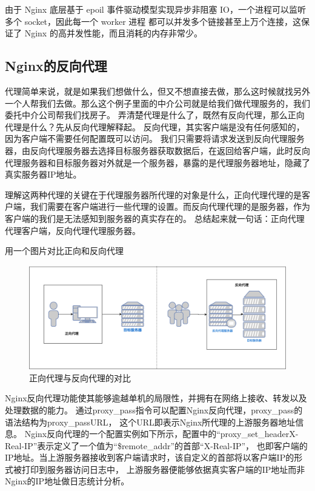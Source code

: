 由于 Nginx 底层基于 epoil 事件驱动模型实现异步非阻塞 IO，一个进程可以监听多个 socket，因此每一个 worker 进程
都可以并发多个链接甚至上万个连接\cite{张炜森2018nginx}，这保证了 Nginx 的高并发性能，而且消耗的内存非常少。

\subsection{Nginx的反向代理}

代理简单来说，就是如果我们想做什么，但又不想直接去做，那么这时候就找另外一个人帮我们去做。那么这个例子里面的中介公司就是给我们做代理服务的，我们委托中介公司帮我们找房子。
弄清楚代理是什么了，既然有反向代理，那么正向代理是什么？先从反向代理解释起。
反向代理，其实客户端是没有任何感知的，因为客户端不需要任何配置既可以访问。
我们只需要将请求发送到反向代理服务器，由反向代理服务器去选择目标服务器获取数据后，在返回给客户端，此时反向代理服务器和目标服务器对外就是一个服务器，暴露的是代理服务器地址，隐藏了真实服务器IP地址。

理解这两种代理的关键在于代理服务器所代理的对象是什么，正向代理代理的是客户端，我们需要在客户端进行一些代理的设置。而反向代理代理的是服务器，作为客户端的我们是无法感知到服务器的真实存在的。
总结起来就一句话：正向代理代理客户端，反向代理代理服务器\cite{崔娟2023基于Nginx反向代理解决公网上服务跨域问题的研究}。

用一个图片对比正向和反向代理

\begin{figure}[htb]
  \centering
  \includegraphics[width=\textwidth]{figures/Forward-Proxy-Reverse-Proxy.png}
  \caption{正向代理与反向代理的对比}
\end{figure}

Nginx反向代理功能使其能够逾越单机的局限性，并拥有在网络上接收、转发以及处理数据的能力\cite{马原龙2016nginx}。
通过proxy\_pass指令可以配置Nginx反向代理，proxy\_pass的语法结构为proxy\_passURL，
这个URL即表示Nginx所代理的上游服务器地址信息。
Nginx反向代理的一个配置实例如下所示，配置中的“proxy\_set\_headerX-Real-IP”表示定义了一个值为“\$remote\_addr”的首部“X-Real-IP”，
也即客户端的IP地址。当上游服务器接收到客户端请求时，该自定义的首部将以客户端IP的形式被打印到服务器访问日志中，
上游服务器便能够依据真实客户端的IP地址而非Nginx的IP地址做日志统计分析\cite{吴陈2020基于Nginx的服务器集群负载均衡策略的研究与改进}。

